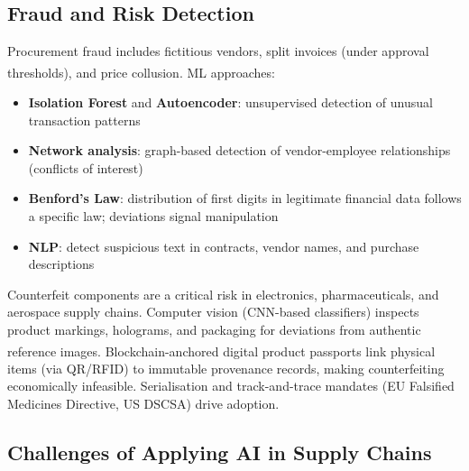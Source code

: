 \subsection{Fraud and Risk Detection}

\begin{tcbitemize}[ skin=sectionraster ]

    \tcbitem[title=Anomaly Detection in Procurement, raster multicolumn=3]
    Procurement fraud includes fictitious vendors, split invoices (under approval thresholds), and price collusion.
    ML approaches\textsuperscript{\cite[][pp.~8--10]{chopraSupplyChainManagement2019}}:
    \begin{itemize}
        \item \textbf{Isolation Forest} and \textbf{Autoencoder}: unsupervised detection of unusual transaction patterns
        \item \textbf{Network analysis}: graph-based detection of vendor-employee relationships (conflicts of interest)
        \item \textbf{Benford's Law}: distribution of first digits in legitimate financial data follows a specific law; deviations signal manipulation
        \item \textbf{NLP}: detect suspicious text in contracts, vendor names, and purchase descriptions
    \end{itemize}

    \tcbitem[title=Counterfeit Detection and Supply Chain Security, raster multicolumn=3]
    Counterfeit components are a critical risk in electronics, pharmaceuticals, and aerospace supply chains.
    Computer vision (CNN-based classifiers) inspects product markings, holograms, and packaging for deviations from authentic reference images\textsuperscript{\cite{laviollaCNNDefectDetection2019}}.
    Blockchain-anchored digital product passports link physical items (via QR/RFID) to immutable provenance records, making counterfeiting economically infeasible.
    Serialisation and track-and-trace mandates (EU Falsified Medicines Directive, US DSCSA) drive adoption.

\end{tcbitemize}

\subsection{Challenges of Applying AI in Supply Chains}


